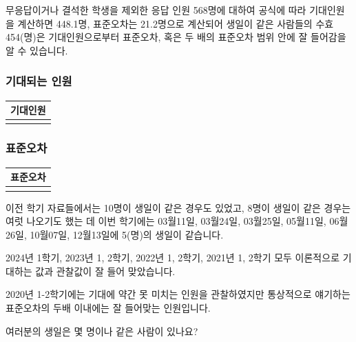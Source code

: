 \documentclass[
]{book}
\begin{document}
무응답이거나 결석한 학생을 제외한 응답 인원 568명에 대하여 공식에 따라 기대인원을 계산하면 448.1명, 표준오차는 21.2명으로 계산되어 생일이 같은 사람들의 수효 454(명)은 기대인원으로부터 표준오차, 혹은 두 배의 표준오차 범위 안에 잘 들어감을 알 수 있습니다.

\subsubsection{기대되는 인원}\label{uxae30uxb300uxb418uxb294-uxc778uxc6d0-1}

\begin{longtable}[]{@{}
  >{\centering\arraybackslash}p{}@{}}
\toprule\noalign{}
\begin{minipage}[b]{\linewidth}\centering
기대인원
\end{minipage} \\
\midrule\noalign{}
\endhead
\bottomrule\noalign{}
\endlastfoot
448.1 \\
\end{longtable}

\subsubsection{표준오차}\label{uxd45cuxc900uxc624uxcc28-1}

\begin{longtable}[]{@{}
  >{\centering\arraybackslash}p{}@{}}
\toprule\noalign{}
\begin{minipage}[b]{\linewidth}\centering
표준오차
\end{minipage} \\
\midrule\noalign{}
\endhead
\bottomrule\noalign{}
\endlastfoot
21.2 \\
\end{longtable}

이전 학기 자료들에서는 10명이 생일이 같은 경우도 있었고, 8명이 생일이 같은 경우는 여럿 나오기도 했는 데 이번 학기에는 03월11일, 03월24일, 03월25일, 05월11일, 06월26일, 10월07일, 12월13일에 5(명)의 생일이 같습니다.

2024년 1학기, 2023년 1, 2학기, 2022년 1, 2학기, 2021년 1, 2학기 모두 이론적으로 기대하는 값과 관찰값이 잘 들어 맞았습니다.

2020년 1-2학기에는 기대에 약간 못 미치는 인원을 관찰하였지만 통상적으로 얘기하는 표준오차의 두배 이내에는 잘 들어맞는 인원입니다.

여러분의 생일은 몇 명이나 같은 사람이 있나요?
\end{document}
